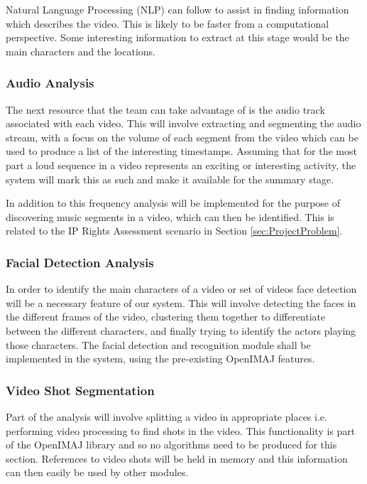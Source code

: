 Natural Language Processing (NLP) can follow to assist in finding information which describes the video. This is likely to be faster from a computational perspective. Some interesting information to extract at this stage would be the main characters and the locations.

\subsubsection{Audio Analysis}
The next resource that the team can take advantage of is the audio track associated with each video. 
This will involve extracting and segmenting the audio stream, with a focus on the volume of each segment from the video which can be used to 
produce a list of the interesting timestamps. Assuming that for the most part a loud sequence in a video represents an exciting or 
interesting activity, the system will mark this as such and make it available for the summary stage.

In addition to this frequency analysis will be implemented for the purpose of discovering music segments in a video, which can then be 
identified. This is related to the IP Rights Assessment scenario in Section \ref{sec:ProjectProblem}.

\subsubsection{Facial Detection Analysis}
In order to identify the main characters of a video or set of videos face detection will be a necessary feature of our system. This will 
involve detecting the faces in the different frames of the video, clustering them together to differentiate between the different characters, 
and finally trying to identify the actors playing those characters. The facial detection and recognition module shall be implemented in the system, 
using the pre-existing OpenIMAJ features.

\subsubsection{Video Shot Segmentation}
Part of the analysis will involve splitting a video in appropriate places i.e. performing video processing to find shots in the video. This functionality is part of the OpenIMAJ library and so no algorithms need to be produced for this section. References to video shots will be held in memory and this information can then easily be used by other modules.

